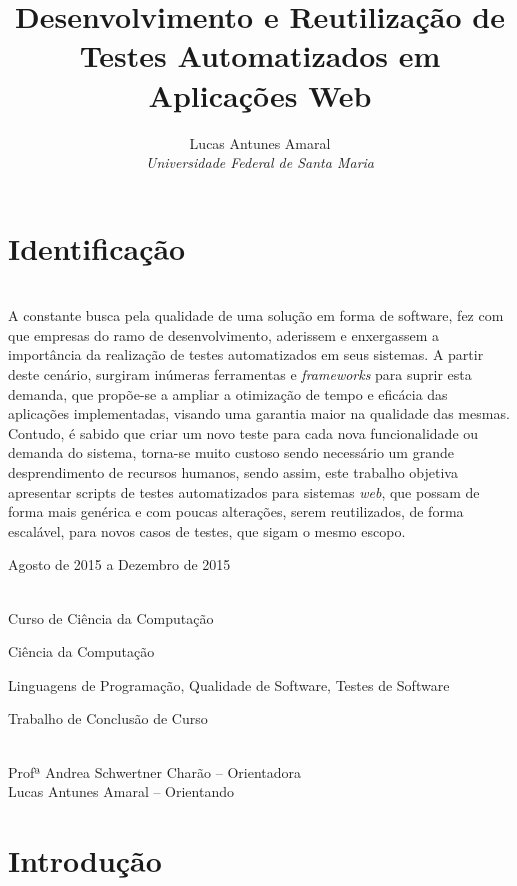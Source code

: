 \documentclass[12pt]{article}
\title{Desenvolvimento e Reutilização de Testes Automatizados em Aplicações Web}
\author{Lucas Antunes Amaral \\ \emph{Universidade Federal de Santa Maria}}
\begin{document}
	\maketitle
	
	\section{Identificação}
	
	\begin{description} \itemsep 0pt
		\item[Resumo:] ~\\
		A constante busca pela qualidade de uma solução em forma de software, fez com que empresas do ramo de desenvolvimento,
		aderissem e enxergassem a importância da realização de testes automatizados em seus sistemas. A partir deste cenário,
		surgiram inúmeras ferramentas e \emph{frameworks} para suprir esta demanda, que propõe-se  a ampliar a otimização de tempo e
		eficácia das aplicações implementadas, visando uma garantia maior na qualidade das mesmas. Contudo, é sabido que criar
		um novo teste para cada nova funcionalidade ou demanda do sistema, torna-se muito custoso sendo necessário um grande
		desprendimento de recursos humanos, sendo assim, este trabalho objetiva apresentar scripts de testes automatizados para
		sistemas \emph{web}, que possam de forma mais genérica e com poucas alterações, serem reutilizados, de forma escalável,
		para novos casos de testes, que sigam o mesmo escopo.
		\item[Período de execução:] Agosto de 2015 a Dezembro de 2015
		\item[Unidades participantes:] ~\\ Curso de Ciência da Computação
		\item[Área de conhecimento:] Ciência da Computação
		\item[Linha de Pesquisa:] Linguagens de Programação, Qualidade de Software, Testes de Software
		\item[Tipo de projeto:] Trabalho de Conclusão de Curso
		\item[Participantes:] ~\\ Profª Andrea Schwertner Charão -- Orientadora \\ Lucas Antunes Amaral -- Orientando
	\end{description}
	
	\section{Introdução}
	
\end{document}
